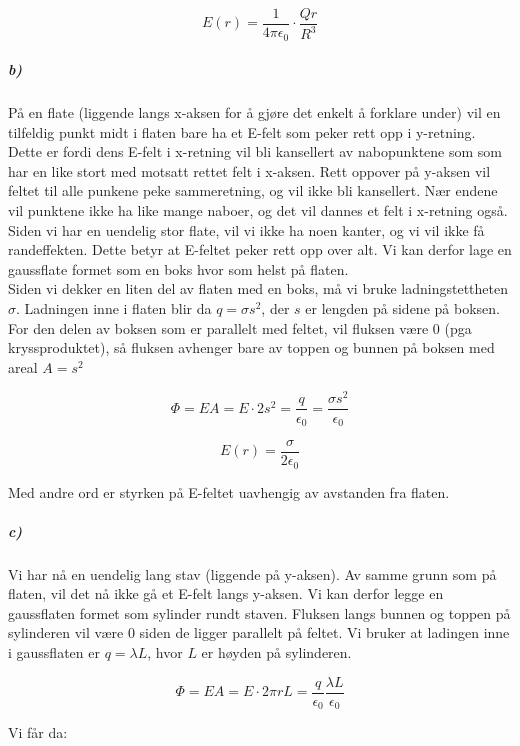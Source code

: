 \documentclass[a4paper,norsk, 10pt]{article}
\begin{document}
\begin{equation}
E(r) = \dfrac{1}{4 \pi \epsilon_0} \cdot \dfrac{Qr}{R^3}
\end{equation}



\subparagraph*{b)}

På en flate (liggende langs x-aksen for å gjøre det enkelt å forklare under) vil en tilfeldig punkt midt i flaten bare ha et E-felt som peker rett opp i y-retning. Dette er fordi dens E-felt i x-retning vil bli kansellert av nabopunktene som som har en like stort med motsatt rettet felt i x-aksen. Rett oppover på y-aksen vil feltet til alle punkene peke sammeretning, og vil ikke bli kansellert. Nær endene vil punktene ikke ha like mange naboer, og det vil dannes et felt i x-retning også. Siden vi har en uendelig stor flate, vil vi ikke ha noen kanter, og vi vil ikke få randeffekten. Dette betyr at E-feltet peker rett opp over alt. Vi kan derfor lage en gaussflate formet som en boks hvor som helst på flaten. \\ 

Siden vi dekker en liten del av flaten med en boks, må vi bruke ladningstettheten $\sigma$. Ladningen inne i flaten blir da $q = \sigma s^2$, der $s$ er lengden på sidene på boksen. For den delen av boksen som er parallelt med feltet, vil fluksen være 0 (pga kryssproduktet), så fluksen avhenger bare av toppen og bunnen på boksen med areal $A=s^2$

$$
\Phi = EA = E \cdot 2s^2  = \dfrac{q}{\epsilon_0} = \dfrac{\sigma s^2}{\epsilon_0}
$$

\begin{equation}
E(r) = \frac{\sigma}{2\epsilon_0}
\end{equation}

Med andre ord er styrken på E-feltet uavhengig av avstanden fra flaten.


\subparagraph*{c)}

Vi har nå en uendelig lang stav (liggende på y-aksen). Av samme grunn som på flaten, vil det nå ikke gå et E-felt langs y-aksen. Vi kan derfor legge en gaussflaten formet som sylinder rundt staven. Fluksen langs bunnen og toppen på sylinderen vil være 0 siden de ligger parallelt på feltet. Vi bruker at ladingen inne i gaussflaten er $q = \lambda L$, hvor $L$ er høyden på sylinderen.



$$ \Phi = EA = E \cdot 2 \pi r L = \frac{q}{\epsilon_0} \dfrac{\lambda L}{\epsilon_0} $$

Vi får da:
\end{document}

